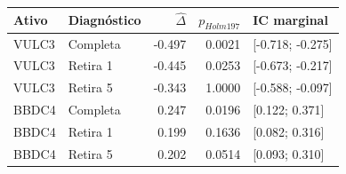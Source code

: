 \begin{tabular}{llrrl}
\toprule
Ativo & Diagnóstico & $\widehat\Delta$ & $p_{Holm197}$ & IC marginal\\
\midrule
VULC3 & Completa & -0.497 & 0.0021 & [-0.718; -0.275]\\
VULC3 & Retira 1 & -0.445 & 0.0253 & [-0.673; -0.217]\\
VULC3 & Retira 5 & -0.343 & 1.0000 & [-0.588; -0.097]\\
BBDC4 & Completa & 0.247 & 0.0196 & [0.122; 0.371]\\
BBDC4 & Retira 1 & 0.199 & 0.1636 & [0.082; 0.316]\\
BBDC4 & Retira 5 & 0.202 & 0.0514 & [0.093; 0.310]\\
\bottomrule
\end{tabular}
